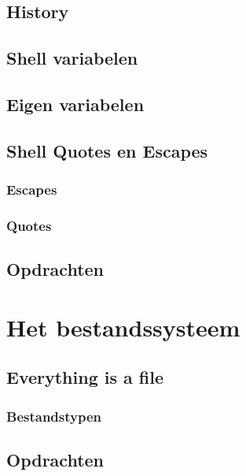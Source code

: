 \documentclass[a4paper,12pt,twoside,openright,titlepage]{book}
\begin{document}
\section{History}

\section{Shell variabelen}

\section{Eigen variabelen}

\section{Shell Quotes en Escapes}

\subsection{Escapes}

\subsection{Quotes}

\section{Opdrachten}

\chapter{Het bestandssysteem}

\section{Everything is a file}

\subsection{Bestandstypen}

\section{Opdrachten}



\backmatter
\printindex
\end{document}

